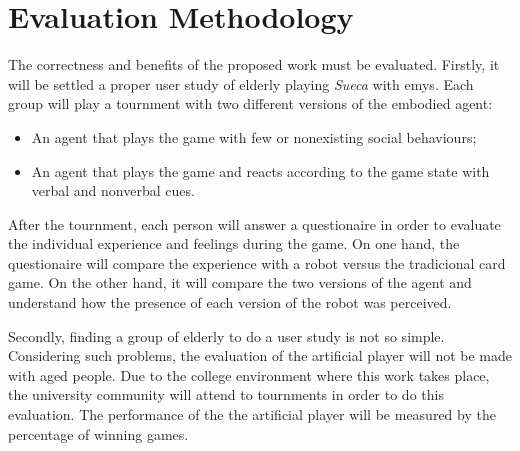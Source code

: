 \section{Evaluation Methodology} \label{sec:evaluation}

The correctness and benefits of the proposed work must be evaluated.
Firstly, it will be settled a proper user study of elderly playing \emph{Sueca} with \gls{emys}.
Each group will play a tournment with two different versions of the embodied agent:
\begin{itemize}
\item An agent that plays the game with few or nonexisting social behaviours;
\item An agent that plays the game and reacts according to the game state with verbal and nonverbal cues.
\end{itemize}
After the tournment, each person will answer a questionaire in order to evaluate the individual experience and feelings during the game.
On one hand, the questionaire will compare the experience with a robot versus the tradicional card game.
On the other hand, it will compare the two versions of the agent and understand how the presence of each version of the robot was perceived.

Secondly, finding a group of elderly to do a user study is not so simple.
Considering such problems, the evaluation of the artificial player will not be made with aged people.
Due to the college environment where this work takes place, the university community will attend to tournments in order to do this evaluation.
The performance of the the artificial player will be measured by the percentage of winning games.